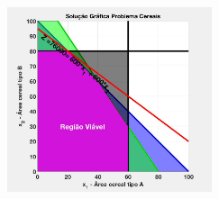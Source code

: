 \documentclass{beamer}
\begin{document}
\begin{frame}
\begin{columns}
\begin{column}{0.5\textwidth}
			\only<21-24> {\includegraphics[width=6cm,height=6cm]{MatLab/anima_18.png} }
		\end{column}
	\end{columns}		
\end{frame}
\end{document}
